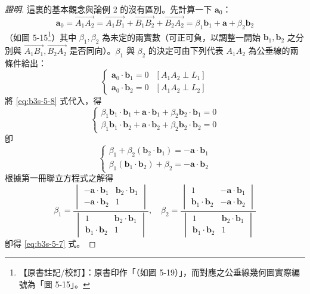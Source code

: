 \begin{proof}[證明]
這裏的基本觀念與論例 2 的沒有區別。先計算一下 $\mathbf{a}_0$：
\begin{equation}
\mathbf{a}_0 = \vec{A_1A_2} = \vec{A_1B_1} + \vec{B_1B_2} + \vec{B_2A_2} = \beta_1 \mathbf{b}_1 + \mathbf{a} + \beta_2 \mathbf{b}_2 \label{eq:b3s-5-8}
\end{equation}
（如圖 5-15\label{note:b3s-ch5-p240-fig-ref}\footnote{【原書註記/校訂】：原書印作「（如圖 5-19）」，而對應之公垂線幾何圖實際編號為「圖 5-15」。}）其中 $\beta_1, \beta_2$ 為未定的兩實數（可正可負，以調整一開始 $\mathbf{b}_1, \mathbf{b}_2$ 之分別與 $\vec{A_1B_1}, \vec{B_2A_2}$ 是否同向）。$\beta_1$ 與 $\beta_2$ 的決定可由下列代表 $A_1A_2$ 為公垂線的兩條件給出：
\[ \begin{cases} \mathbf{a}_0 \cdot \mathbf{b}_1 = 0 & [A_1A_2 \perp L_1] \\ \mathbf{a}_0 \cdot \mathbf{b}_2 = 0 & [A_1A_2 \perp L_2] \end{cases} \]
將 \eqref{eq:b3s-5-8} 式代入，得
\[ \begin{cases} \beta_1 \mathbf{b}_1 \cdot \mathbf{b}_1 + \mathbf{a} \cdot \mathbf{b}_1 + \beta_2 \mathbf{b}_2 \cdot \mathbf{b}_1 = 0 \\ \beta_1 \mathbf{b}_1 \cdot \mathbf{b}_2 + \mathbf{a} \cdot \mathbf{b}_2 + \beta_2 \mathbf{b}_2 \cdot \mathbf{b}_2 = 0 \end{cases} \]
卽
\[ \begin{cases} \beta_1 + \beta_2 (\mathbf{b}_2 \cdot \mathbf{b}_1) = -\mathbf{a} \cdot \mathbf{b}_1 \\ \beta_1 (\mathbf{b}_1 \cdot \mathbf{b}_2) + \beta_2 = -\mathbf{a} \cdot \mathbf{b}_2 \end{cases} \]
根據第一冊聯立方程式之解得
\[ \beta_1 = \frac{\begin{vmatrix} -\mathbf{a} \cdot \mathbf{b}_1 & \mathbf{b}_2 \cdot \mathbf{b}_1 \\ -\mathbf{a} \cdot \mathbf{b}_2 & 1 \end{vmatrix}}{\begin{vmatrix} 1 & \mathbf{b}_2 \cdot \mathbf{b}_1 \\ \mathbf{b}_1 \cdot \mathbf{b}_2 & 1 \end{vmatrix}},\quad \beta_2 = \frac{\begin{vmatrix} 1 & -\mathbf{a} \cdot \mathbf{b}_1 \\ \mathbf{b}_1 \cdot \mathbf{b}_2 & -\mathbf{a} \cdot \mathbf{b}_2 \end{vmatrix}}{\begin{vmatrix} 1 & \mathbf{b}_2 \cdot \mathbf{b}_1 \\ \mathbf{b}_1 \cdot \mathbf{b}_2 & 1 \end{vmatrix}} \]
卽得 \eqref{eq:b3s-5-7} 式。
\end{proof}

